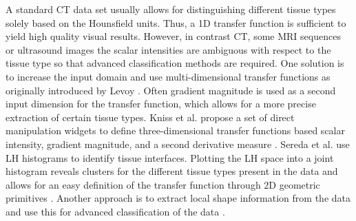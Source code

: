 A standard CT data set usually allows for distinguishing different tissue types solely based on the Hounsfield units.
Thus, a 1D transfer function is sufficient to yield high quality visual results.
However, in contrast CT, some MRI sequences or ultrasound images the scalar intensities are ambiguous with respect to the tissue type so that advanced classification methods are required.
One solution is to increase the input domain and use multi-dimensional transfer functions as originally introduced by Levoy \cite{Levoy:1988:VolumeSurfaces}.
Often gradient magnitude is used as a second input dimension for the transfer function, which allows for a more precise extraction of certain tissue types.
Kniss et al. propose a set of direct manipulation widgets to define three-dimensional transfer functions based scalar intensity, gradient magnitude, and a second derivative measure \cite{Kniss:2002:MultidimensionalTf}.
Sereda et al. use LH histograms to identify tissue interfaces.
Plotting the LH space into a joint histogram reveals clusters for the different tissue types present in the data and allows for an easy definition of the transfer function through 2D geometric primitives \cite{Sereda:2006:LhHistograms}.
Another approach is to extract local shape information from the data and use this for advanced classification of the data \cite{Prassni:2010:ShapeBasedTf}.

